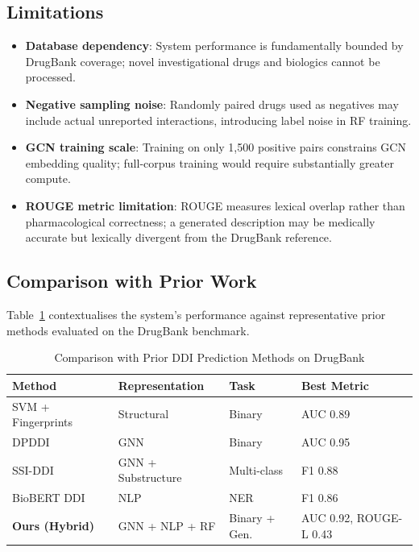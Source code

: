\documentclass[12pt,a4paper,oneside]{report}
\begin{document}
\subsection{Limitations}

\begin{itemize}
  \item \textbf{Database dependency}: System performance is fundamentally bounded by
  DrugBank coverage; novel investigational drugs and biologics cannot be processed.
  \item \textbf{Negative sampling noise}: Randomly paired drugs used as negatives may
  include actual unreported interactions, introducing label noise in RF training.
  \item \textbf{GCN training scale}: Training on only 1,500 positive pairs constrains GCN
  embedding quality; full-corpus training would require substantially greater compute.
  \item \textbf{ROUGE metric limitation}: ROUGE measures lexical overlap rather than
  pharmacological correctness; a generated description may be medically accurate but
  lexically divergent from the DrugBank reference.
\end{itemize}

\subsection{Comparison with Prior Work}

Table~\ref{tab:comparison} contextualises the system's performance against representative
prior methods evaluated on the DrugBank benchmark.

\begin{table}[htbp]
\centering
\caption{Comparison with Prior DDI Prediction Methods on DrugBank}
\label{tab:comparison}
\begin{tabular}{p{3.8cm} p{2.8cm} p{2.8cm} p{2.8cm}}
\toprule
\textbf{Method} & \textbf{Representation} & \textbf{Task} & \textbf{Best Metric} \\
\midrule
SVM + Fingerprints~\cite{vilar2012detection}    & Structural       & Binary        & AUC 0.89 \\
DPDDI~\cite{feng2020dpddi}                      & GNN              & Binary        & AUC 0.95 \\
SSI-DDI~\cite{jaeger2021hyper}                  & GNN + Substructure & Multi-class & F1 0.88  \\
BioBERT DDI~\cite{lee2020biobert}               & NLP              & NER           & F1 0.86  \\
\textbf{Ours (Hybrid)}                          & GNN + NLP + RF   & Binary + Gen. & AUC 0.92, ROUGE-L 0.43 \\
\bottomrule
\end{tabular}
\end{table}
\end{document}
